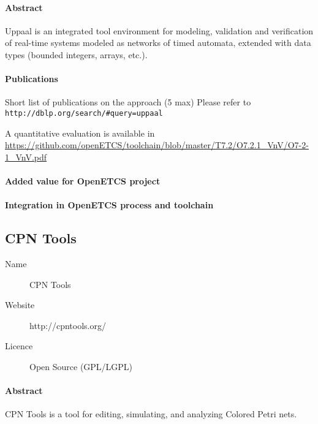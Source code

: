 \paragraph{Abstract} Uppaal is an integrated tool environment for modeling, validation and verification of real-time systems modeled as networks of timed automata, extended with data types (bounded integers, arrays, etc.).

\paragraph{Publications} Short list of publications on the approach (5 max)
Please refer to \verb|http://dblp.org/search/#query=uppaal|



A quantitative evaluation is available in \url{https://github.com/openETCS/toolchain/blob/master/T7.2/O7.2.1_VnV/O7-2-1_VnV.pdf}


\paragraph{Added value for OpenETCS project}

\begin{comment}
To complete: Stefan Rieger  ?
\end{comment}


\paragraph{Integration in OpenETCS process and toolchain}

\begin{comment}
To complete: Stefan Rieger  ?
\end{comment}


\subsection{CPN Tools}
\label{sec:CPN-Tools}

\begin{description}
\item[Name] CPN Tools
\item[Website] http://cpntools.org/
\item[Licence] Open Source (GPL/LGPL)
\end{description}

\paragraph{Abstract} CPN Tools is a tool for editing, simulating, and analyzing Colored Petri nets.


